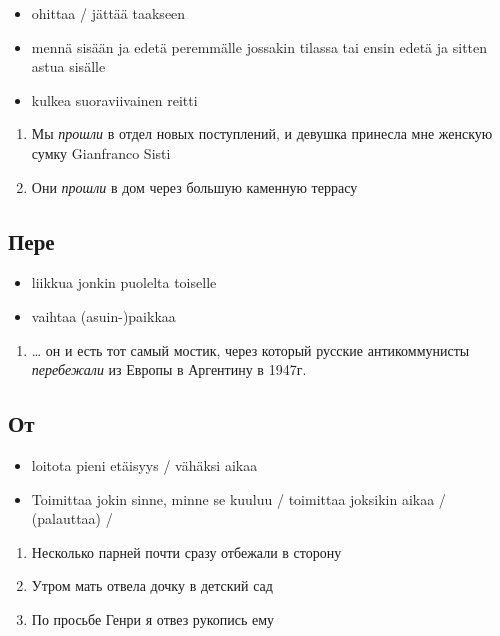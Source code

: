 \documentclass[]{scrreprt}
\providecommand{\tightlist}{%
  \setlength{\itemsep}{0pt}\setlength{\parskip}{0pt}}
\begin{document}
\begin{itemize}
\tightlist
\item
  ohittaa / jättää taakseen
\item
  mennä sisään ja edetä peremmälle jossakin tilassa tai ensin edetä ja
  sitten astua sisälle
\item
  kulkea suoraviivainen reitti
\end{itemize}

\begin{enumerate}
\def\labelenumi{(\arabic{enumi})}
\setcounter{enumi}{431}
\tightlist
\item
  Мы \emph{прошли} в отдел новых поступлений, и девушка принесла мне
  женскую сумку Gianfranco Sisti
\item
  Они \emph{прошли} в дом через большую каменную террасу
\end{enumerate}

\subsection{Пере}\label{ux43fux435ux440ux435}

\begin{itemize}
\tightlist
\item
  liikkua jonkin puolelta toiselle
\item
  vaihtaa (asuin-)paikkaa
\end{itemize}

\begin{enumerate}
\def\labelenumi{(\arabic{enumi})}
\setcounter{enumi}{433}
\tightlist
\item
  \ldots{} он и есть тот самый мостик, через который русские
  антикоммунисты \emph{перебежали} из Европы в Аргентину в 1947г.
\end{enumerate}

\subsection{От}\label{ux43eux442}

\begin{itemize}
\tightlist
\item
  loitota pieni etäisyys / vähäksi aikaa
\item
  Toimittaa jokin sinne, minne se kuuluu / toimittaa joksikin aikaa /
  (palauttaa) /
\end{itemize}

\begin{enumerate}
\def\labelenumi{(\arabic{enumi})}
\setcounter{enumi}{434}
\tightlist
\item
  Несколько парней почти сразу отбежали в сторону
\item
  Утром мать отвела дочку в детский сад
\item
  По просьбе Генри я отвез рукопись ему
\end{enumerate}
\end{document}
